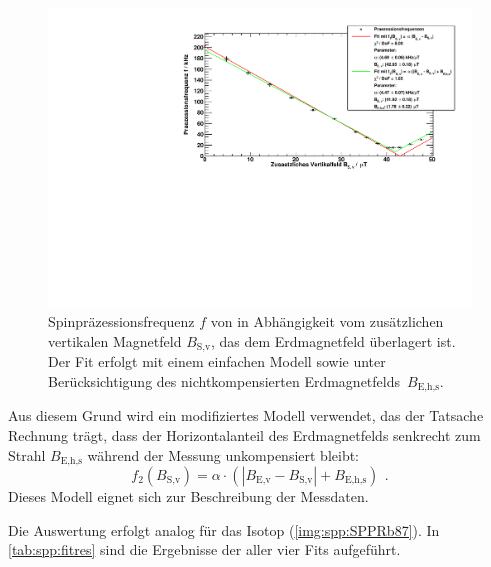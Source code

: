 \begin{figure}[H]
\begin{center}
  \includegraphics[width=\textwidth]{../img/part4/Rb85.pdf}
  \caption{Spinpräzessionsfrequenz $f$ von  in Abhängigkeit
  vom zusätzlichen vertikalen Magnetfeld $B_\text{S,v}$, das dem Erdmagnetfeld überlagert ist.
  Der Fit erfolgt mit einem einfachen Modell sowie unter Berücksichtigung des
  nichtkompensierten Erdmagnetfelds~$B_\text{E,h,s}$.}
  \label{img:spp:SPPRb85}
\end{center}
\end{figure} 

Aus diesem Grund wird ein modifiziertes Modell verwendet, das der Tatsache Rechnung trägt,
dass der Horizontalanteil des Erdmagnetfelds senkrecht zum Strahl $B_\text{E,h,s}$
während der Messung unkompensiert bleibt:
\begin{equation}
  f_2(B_\text{S,v})=\alpha \cdot (|B_\text{E,v}-B_\text{S,v}| + B_\text{E,h,s}) \ \, .
\end{equation}
Dieses Modell eignet sich zur Beschreibung der Messdaten.

Die Auswertung erfolgt analog für das Isotop  (\autoref{img:spp:SPPRb87}).
In \autoref{tab:spp:fitres} sind die Ergebnisse der aller vier Fits aufgeführt.

